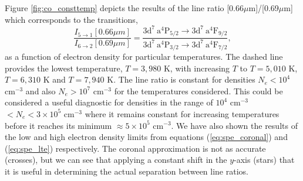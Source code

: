 Figure \ref{fig:co_consttemp} depicts the results of the line ratio [0.66$\mu$m]/[0.69$\mu$m] which corresponds to the transitions,
\[
\frac{I_{5\rightarrow1}[0.66\mu m]}{I_{6\rightarrow2}[0.69\mu m]} = \frac{3\text{d}^7 ~\text{a}^4\text{P}_{5/2}\rightarrow 3\text{d}^7 ~\text{a}^4\text{F}_{9/2}}{3\text{d}^7 ~\text{a}^4\text{P}_{3/2} \rightarrow 3\text{d}^7 ~\text{a}^4\text{F}_{7/2}},
\]
as a function of electron density for particular temperatures. The dashed line provides the lowest temperature, $T = 3,980$ K, with increasing $T$ to $T = 5,010$ K, $T = 6,310$ K and $T = 7,940$ K. The line ratio is constant for densities $N_e < 10^{4}$ cm$^{-3}$ and also $N_e > 10^{7}$ cm$^{-3}$ for the temperatures considered. This could be considered a useful diagnostic for densities in the range of $10^{4}$ cm$^{-3}$ $< N_e < 3\times10^{5}$ cm$^{-3}$ where it remains constant for increasing temperatures before it reaches its minimum $\approx 5\times 10^{5}$ cm$^{-3}$. We have also shown the results of the low and high electron density limits from equations (\ref{eq:spe_coronal}) and (\ref{eq:spe_lte}) respectively. The coronal approximation is not as accurate (crosses), but we can see that applying a constant shift in the $y$-axis (stars) that it is useful in determining the actual separation between line ratios. 

